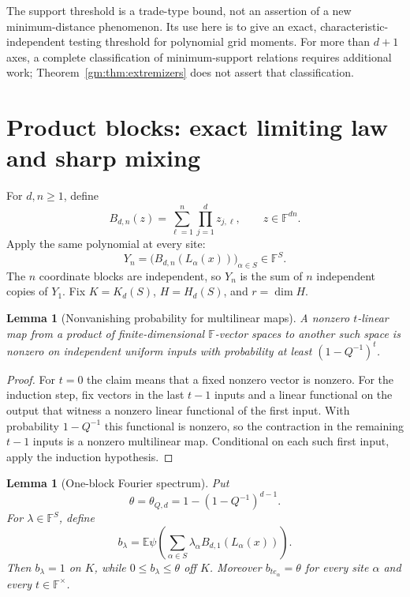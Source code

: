 \documentclass[11pt,a4paper]{article}
\numberwithin{equation}{section}
\newtheorem{lemma}[theorem]{Lemma}
\theoremstyle{definition}
\theoremstyle{remark}
\newcommand{\F}{\mathbb F}
\newcommand{\E}{\mathbb E}
\newcommand{\1}{\mathbf 1}
\begin{document}
The support threshold is a trade-type bound, not an assertion of a new
minimum-distance phenomenon. Its use here is to give an exact,
characteristic-independent testing threshold for polynomial grid moments.
For more than $d+1$ axes, a complete classification of minimum-support
relations requires additional work; Theorem~\ref{gm:thm:extremizers} does
not assert that classification.

\section{Product blocks: exact limiting law and sharp mixing}
\label{gm:sec:mixing}

For $d,n\geq1$, define
\begin{equation}\label{gm:eq:product-block}
 B_{d,n}(z)=\sum_{\ell=1}^n\prod_{j=1}^d z_{j,\ell},
 \qquad z\in\F^{d n}.
\end{equation}
Apply the same polynomial at every site:
\[
 Y_n=\bigl(B_{d,n}(L_\alpha(x))\bigr)_{\alpha\in S}\in\F^S.
\]
The $n$ coordinate blocks are independent, so $Y_n$ is the sum of $n$
independent copies of $Y_1$. Fix $K=K_d(S)$, $H=H_d(S)$, and $r=\dim H$.

\begin{lemma}[Nonvanishing probability for multilinear maps]
\label{gm:lem:multilinear}
A nonzero $t$-linear map from a product of finite-dimensional $\F$-vector
spaces to another such space is nonzero on independent uniform inputs
with probability at least $(1-Q^{-1})^t$.
\end{lemma}

\begin{proof}
For $t=0$ the claim means that a fixed nonzero vector is nonzero. For the
induction step, fix vectors in the last $t-1$ inputs and a linear
functional on the output that witness a nonzero linear functional of the
first input. With probability $1-Q^{-1}$ this functional is nonzero, so
the contraction in the remaining $t-1$ inputs is a nonzero multilinear
map. Conditional on each such first input, apply the induction hypothesis.
\end{proof}

\begin{lemma}[One-block Fourier spectrum]\label{gm:lem:block-spectrum}
Put
\begin{equation}\label{gm:eq:theta}
 \theta=\theta_{Q,d}=1-(1-Q^{-1})^{d-1}.
\end{equation}
For $\lambda\in\F^S$, define
\[
 b_\lambda=\E\psi\!\left(\sum_{\alpha\in S}
                  \lambda_\alpha B_{d,1}(L_\alpha(x))\right).
\]
Then $b_\lambda=1$ on $K$, while $0\leq b_\lambda\leq\theta$ off $K$.
Moreover $b_{t e_\alpha}=\theta$ for every site $\alpha$ and every
$t\in\F^\times$.
\end{lemma}
\end{document}
